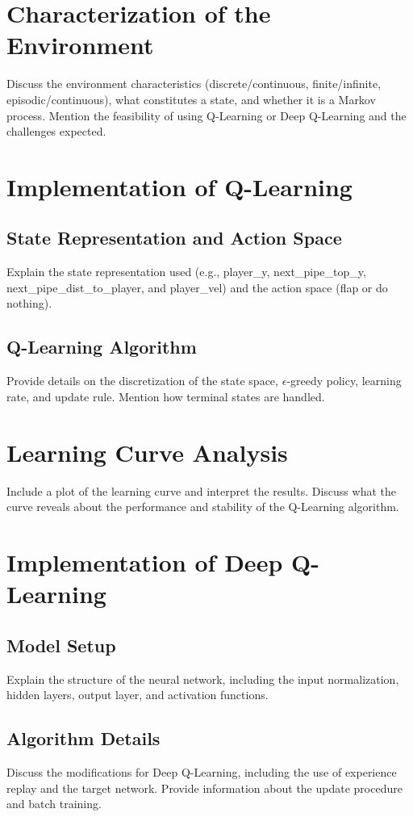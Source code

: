 \documentclass[a4paper,12pt]{article}
\begin{document}
\section{Characterization of the Environment}
Discuss the environment characteristics (discrete/continuous, finite/infinite, episodic/continuous), what constitutes a state, and whether it is a Markov process. Mention the feasibility of using Q-Learning or Deep Q-Learning and the challenges expected.

\section{Implementation of Q-Learning}
\subsection{State Representation and Action Space}
Explain the state representation used (e.g., player\_y, next\_pipe\_top\_y, next\_pipe\_dist\_to\_player, and player\_vel) and the action space (flap or do nothing).

\subsection{Q-Learning Algorithm}
Provide details on the discretization of the state space, \(\epsilon\)-greedy policy, learning rate, and update rule. Mention how terminal states are handled.

\section{Learning Curve Analysis}
Include a plot of the learning curve and interpret the results. Discuss what the curve reveals about the performance and stability of the Q-Learning algorithm.

\section{Implementation of Deep Q-Learning}
\subsection{Model Setup}
Explain the structure of the neural network, including the input normalization, hidden layers, output layer, and activation functions.

\subsection{Algorithm Details}
Discuss the modifications for Deep Q-Learning, including the use of experience replay and the target network. Provide information about the update procedure and batch training.
\end{document}
